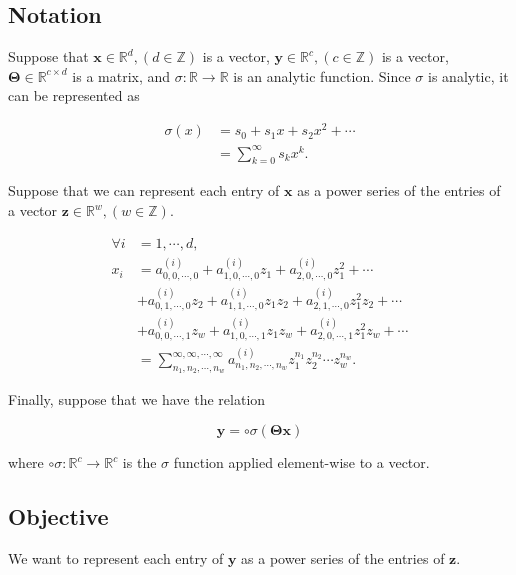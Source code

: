 \documentclass{article}
\begin{document}
\subsection{Notation}

\noindent
Suppose that $\mathbf{x} \in \mathbb{R}^d, (d \in \mathbb{Z})$ is a vector, $\mathbf{y} \in \mathbb{R}^c, (c \in \mathbb{Z})$ is a vector, $\mathbf{\Theta} \in \mathbb{R}^{c \times d}$ is a matrix, and $\sigma: \mathbb{R} \to \mathbb{R}$ is an analytic function. Since $\sigma$ is analytic, it can be represented as

\begin{align*}
    \sigma(x)
    &= s_0 + s_1 x + s_2 x^2 + \cdots \\
    &= \sum_{k=0}^{\infty} s_{k} x^{k}.
\end{align*}

\noindent
Suppose that we can represent each entry of $\mathbf{x}$ as a power series of the entries of a vector $\mathbf{z} \in \mathbb{R}^{w}, (w \in \mathbb{Z})$.

\begin{align*}
    \forall i &= 1, \cdots, d, \\ x_i
    &= a^{(i)}_{0,0,\cdots,0} + a^{(i)}_{1,0,\cdots,0} z_1 + a^{(i)}_{2,0,\cdots,0} z_1^2 + \cdots \\
    &+ a^{(i)}_{0,1,\cdots,0} z_2 + a^{(i)}_{1,1,\cdots,0} z_1 z_2 + a^{(i)}_{2,1,\cdots,0} z_1^2 z_2 + \cdots \\
    &+ a^{(i)}_{0,0,\cdots,1} z_w + a^{(i)}_{1,0,\cdots,1} z_1 z_w + a^{(i)}_{2,0,\cdots,1} z_1^2 z_w + \cdots \\
    &= \sum_{n_1,n_2,\cdots,n_w}^{\infty,\infty,\cdots,\infty} a^{(i)}_{n_1,n_2,\cdots,n_w} z_1^{n_1} z_2^{n_2} \cdots z_w^{n_w}.
\end{align*}

\noindent
Finally, suppose that we have the relation

\begin{equation*}
    \mathbf{y} = \circ\sigma(\mathbf{\Theta} \mathbf{x})
\end{equation*}

\noindent
where $\circ\sigma: \mathbb{R}^{c} \to \mathbb{R}^{c}$ is the $\sigma$ function applied element-wise to a vector.

\subsection{Objective}
\noindent
We want to represent each entry of $\mathbf{y}$ as a power series of the entries of $\mathbf{z}$.
\end{document}
